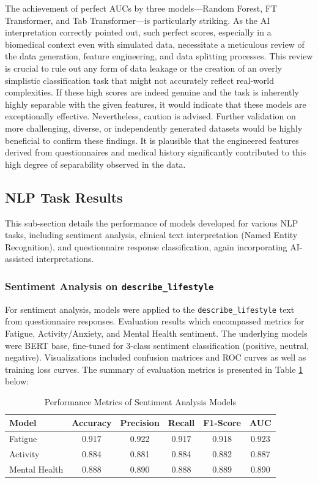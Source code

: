 The achievement of perfect AUCs by three models—Random Forest, FT Transformer, and Tab Transformer—is particularly striking. As the AI interpretation correctly pointed out, such perfect scores, especially in a biomedical context even with simulated data, necessitate a meticulous review of the data generation, feature engineering, and data splitting processes. This review is crucial to rule out any form of data leakage or the creation of an overly simplistic classification task that might not accurately reflect real-world complexities. If these high scores are indeed genuine and the task is inherently highly separable with the given features, it would indicate that these models are exceptionally effective. Nevertheless, caution is advised. Further validation on more challenging, diverse, or independently generated datasets would be highly beneficial to confirm these findings. It is plausible that the engineered features derived from questionnaires and medical history significantly contributed to this high degree of separability observed in the data.

\subsection{NLP Task Results}

This sub-section details the performance of models developed for various NLP tasks, including sentiment analysis, clinical text interpretation (Named Entity Recognition), and questionnaire response classification, again incorporating AI-assisted interpretations.

\subsubsection{Sentiment Analysis on \texttt{describe\_lifestyle}}

For sentiment analysis, models were applied to the \texttt{describe\_lifestyle} text from questionnaire responses. Evaluation results which encompassed metrics for Fatigue, Activity/Anxiety, and Mental Health sentiment. The underlying models were BERT base, fine-tuned for 3-class sentiment classification (positive, neutral, negative). Visualizations included confusion matrices and ROC curves as well as training loss curves. The summary of evaluation metrics is presented in Table \ref{tab:sentiment_analysis_performance} below:

\begin{table}[htbp]
    \centering
    \caption{Performance Metrics of Sentiment Analysis Models}
    \label{tab:sentiment_analysis_performance}
    \begin{tabular}{lccccc}
        \hline
        \textbf{Model} & \textbf{Accuracy} & \textbf{Precision} & \textbf{Recall} & \textbf{F1-Score} & \textbf{AUC} \\
        \hline
        Fatigue & 0.917 & 0.922 & 0.917 & 0.918 & 0.923 \\
        Activity & 0.884 & 0.881 & 0.884 & 0.882 & 0.887 \\
        Mental Health & 0.888 & 0.890 & 0.888 & 0.889 & 0.890 \\
        \hline
    \end{tabular}
\end{table}

